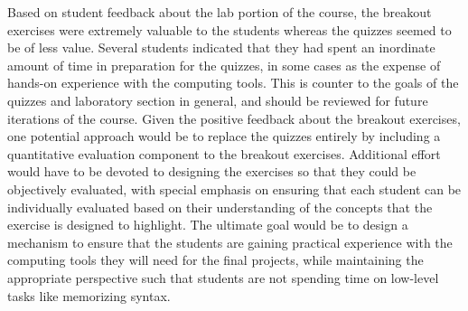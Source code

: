 Based on student feedback about the lab portion of the course, the breakout
exercises were extremely valuable to the students whereas the quizzes seemed
to be of less value.
Several students indicated that they had spent an inordinate amount of time in
preparation for the quizzes, in some cases as the expense of hands-on
experience with the computing tools.
This is counter to the goals of the quizzes and laboratory section in general,
and should be reviewed for future iterations of the course.
Given the positive feedback about the breakout exercises, one potential 
approach would be to replace the quizzes entirely by including a quantitative
evaluation component to the breakout exercises.
Additional effort would have to be devoted to designing the exercises so that
they could be objectively evaluated, with special emphasis on ensuring that
each student can be individually evaluated based on their understanding of the
concepts that the exercise is designed to highlight.
The ultimate goal would be to design a mechanism to ensure that the students
are gaining practical experience with the computing tools they will need for 
the final projects, while maintaining the appropriate perspective such that
students are not spending time on low-level tasks like memorizing syntax.

